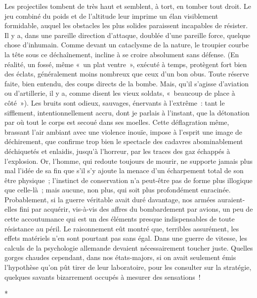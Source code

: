 \documentclass[french,twoside]{book} %
\begin{document}
Les projectiles tombent de très haut et semblent, à tort, en tomber tout droit. Le jeu combiné du poids et de l’altitude leur imprime un élan visiblement formidable, auquel les obstacles les plus solides paraissent incapables de résister. Il y a, dans une pareille direction d’attaque, doublée d’une pareille force, quelque chose d’inhumain. Comme devant un cataclysme de la nature, le troupier courbe la tête sous ce déchaînement, incline à se croire absolument sans défense. (En réalité, un fossé, même « un plat ventre », exécuté à temps, protègent fort bien des éclats, généralement moins nombreux que ceux d’un bon obus. Toute réserve faite, bien entendu, des coups directs de la bombe. Mais, qu’il s’agisse d’aviation ou d’artillerie, il y a, comme disent les vieux soldats, « beaucoup de place à côté »). Les bruits sont odieux, sauvages, énervants à l’extrême : tant le sifflement, intentionnellement accru, dont je parlais à l’instant, que la détonation par où tout le corps est secoué dans ses moelles. Cette déflagration même, brassant l’air ambiant avec une violence inouïe, impose à l’esprit une image de déchirement, que confirme trop bien le spectacle des cadavres abominablement déchiquetés et enlaidis, jusqu’à l’horreur, par les traces des gaz échappés à l’explosion. Or, l’homme, qui redoute toujours de mourir, ne supporte jamais plus mal l’idée de sa fin que s’il s’y ajoute la menace d’un écharpement total de son être physique ; l’instinct de conservation n’a peut-être pas de forme plus illogique que celle-là ; mais aucune, non plus, qui soit plus profondément enracinée. Probablement, si la guerre véritable avait duré davantage, nos armées auraient-elles fini par acquérir, vis-à-vis des affres du bombardement par avions, un peu de cette accoutumance qui est un   des éléments presque indispensables de toute résistance au péril. Le raisonnement eût montré que, terribles assurément, les effets matériels n’en sont pourtant pas sans égal. Dans une guerre de vitesse, les calculs de la psychologie allemande devaient nécessairement toucher juste. Quelles gorges chaudes cependant, dans nos états-majors, si on avait seulement émis l’hypothèse qu’on pût tirer de leur laboratoire, pour les consulter sur la stratégie, quelques savants bizarrement occupés à mesurer des sensations !\par

\begin{center}
*\par
\end{center}
\end{document}
